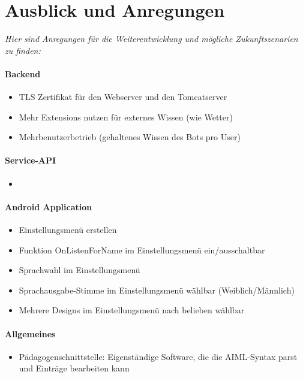\section{Ausblick und Anregungen}
	\textsl{Hier sind Anregungen für die Weiterentwicklung und mögliche Zukunftszenarien zu finden:}
	
	\paragraph{Backend}
		\begin{itemize}\itemsep0pt
			\item{TLS Zertifikat für den Webserver und den Tomcatserver}
			\item{Mehr Extensions nutzen für externes Wissen (wie Wetter)}
			\item{Mehrbenutzerbetrieb (gehaltenes Wissen des Bots pro User)}
		\end{itemize}
		
	\paragraph{Service-API}
		\begin{itemize}\itemsep0pt
			\item{}
		\end{itemize}
		
	\paragraph{Android Application}
		\begin{itemize}\itemsep0pt
			\item{Einstellungsmenü erstellen}
			\item{Funktion OnListenForName im Einstellungsmenü ein/ausschaltbar}
			\item{Sprachwahl im Einstellungsmenü}
			\item{Sprachausgabe-Stimme im Einstellungsmenü wählbar (Weiblich/Männlich)}
			\item{Mehrere Designs im Einstellungsmenü nach belieben wählbar}
		\end{itemize}
		
	\paragraph{Allgemeines}
	\begin{itemize}\itemsep0pt
		\item{Pädagogenschnittstelle: Eigenständige Software, die die AIML-Syntax parst und Einträge bearbeiten kann}
	\end{itemize}